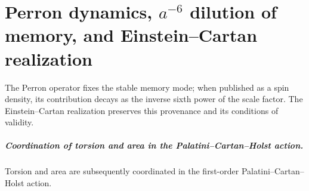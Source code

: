 \chapter{Perron dynamics, \texorpdfstring{\(a^{-6}\)}{a⁻⁶} dilution of memory, and Einstein–Cartan realization}
\label{chap:parte-iv-67}

The Perron operator fixes the stable memory mode; when published as a spin density, its contribution decays as the inverse sixth power of the scale factor. The Einstein--Cartan realization preserves this provenance and its conditions of validity.



\paragraph{Coordination of torsion and area in the Palatini--Cartan--Holst action.} Torsion and area are subsequently coordinated in the first-order Palatini--Cartan--Holst action.
